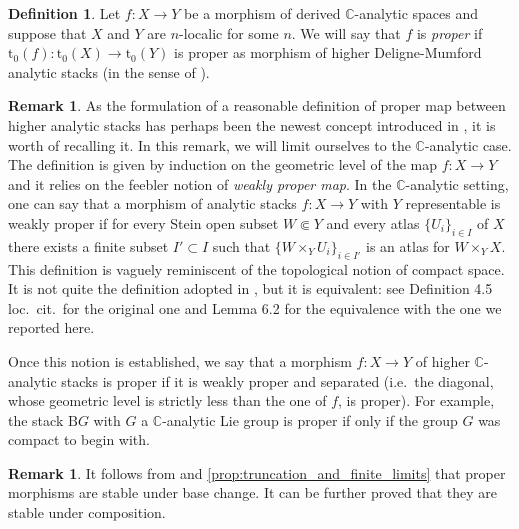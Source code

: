 \documentclass[12pt,a4paper,reqno]{amsart}
\theoremstyle{plain}
\theoremstyle{definition}
\newtheorem{defin}[thm]{Definition}
\newtheorem{rem}[thm]{Remark}
\theoremstyle{remark}
\numberwithin{equation}{section}
\begin{document}
\begin{defin} \label{def:proper_morphism_derived_canal_spaces}
	Let $f \colon X \to Y$ be a morphism of derived {$\mathbb C$-analytic\xspace} spaces and suppose that $X$ and $Y$ are $n$-localic for some $n$.
	We will say that $f$ is \emph{proper} if ${\mathrm{t}_0}(f) \colon {\mathrm{t}_0}(X) \to {\mathrm{t}_0}(Y)$ is proper as morphism of higher {Deligne-Mumford\xspace} analytic stacks (in the sense of \cite[Definition 4.8]{Porta_Yu_Higher_analytic_stacks_2014}).
\end{defin}

\begin{rem}
	As the formulation of a reasonable definition of proper map between higher analytic stacks has perhaps been the newest concept introduced in \cite{Porta_Yu_Higher_analytic_stacks_2014}, it is worth of recalling it. In this remark, we will limit ourselves to the {$\mathbb C$-analytic\xspace} case. The definition is given by induction on the geometric level of the map $f \colon X \to Y$ and it relies on the feebler notion of \emph{weakly proper map}. In the {$\mathbb C$-analytic\xspace} setting, one can say that a morphism of analytic stacks $f \colon X \to Y$ with $Y$ representable is weakly proper if for every Stein open subset $W \Subset Y$ and every atlas $\{U_i\}_{i \in I}$ of $X$ there exists a finite subset $I' \subset I$ such that $\{W \times_Y U_i\}_{i \in I'}$ is an atlas for $W \times_Y X$.
	This definition is vaguely reminiscent of the topological notion of compact space. It is not quite the definition adopted in \cite{Porta_Yu_Higher_analytic_stacks_2014}, but it is equivalent: see Definition 4.5 loc.\ cit.\ for the original one and Lemma 6.2 for the equivalence with the one we reported here.
	
	Once this notion is established, we say that a morphism $f \colon X \to Y$ of higher {$\mathbb C$-analytic\xspace} stacks is proper if it is weakly proper and separated (i.e.\ the diagonal, whose geometric level is strictly less than the one of $f$, is proper). For example, the stack $\mathrm BG$ with $G$ a {$\mathbb C$-analytic\xspace} Lie group is proper if only if the group $G$ was compact to begin with.
\end{rem}

\begin{rem}
	It follows from \cite[Lemma 4.12]{Porta_Yu_Higher_analytic_stacks_2014} and \cref{prop:truncation_and_finite_limits} that proper morphisms are stable under base change. It can be further proved that they are stable under composition.
\end{rem}
\end{document}
